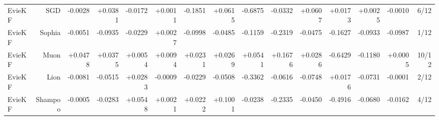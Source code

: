 \begin{table}[t]
\begin{tabular}{lrrrrrrrrrrrrrr}
EvieKF & SGD & -0.0028 & +0.0381 & -0.0172 & +0.0011 & -0.1851 & +0.0615 & -0.6875 & -0.0332 & +0.0607 & +0.0173 & +0.0025 & -0.0010 & 6/12 \\
EvieKF & Sophia & -0.0051 & -0.0935 & -0.0229 & +0.0027 & -0.0998 & -0.0485 & -0.1159 & -0.2319 & -0.0475 & -0.1627 & -0.0933 & -0.0987 & 1/12 \\
EvieKF & Muon & +0.0478 & +0.0375 & +0.0054 & +0.0094 & +0.0231 & +0.0269 & +0.0541 & +0.1676 & +0.0286 & -0.6429 & -0.1180 & +0.0005 & 10/12 \\
EvieKF & Lion & -0.0081 & -0.0515 & +0.0283 & -0.0009 & -0.0229 & -0.0508 & -0.3362 & -0.0616 & -0.0748 & +0.0176 & -0.0731 & -0.0001 & 2/12 \\
EvieKF & Shampoo & -0.0005 & -0.0283 & +0.0548 & +0.0021 & +0.0222 & +0.1001 & -0.0238 & -0.2335 & -0.0450 & -0.4916 & -0.0680 & -0.0162 & 4/12 \\
\bottomrule
\end{tabular}
\end{table}
